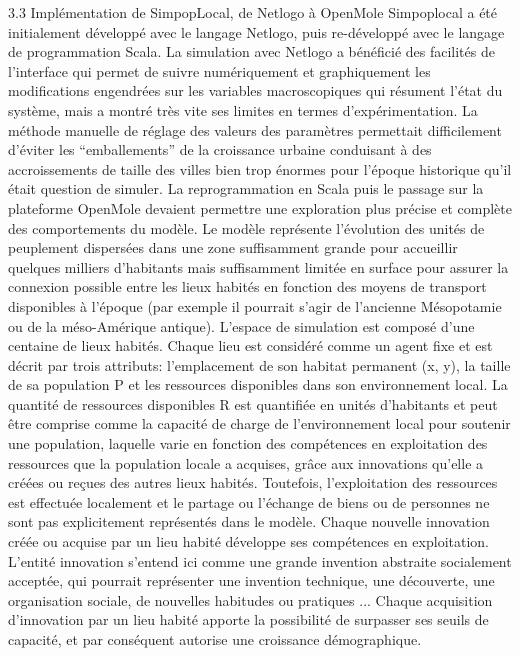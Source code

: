 \documentclass[10pt]{article}
\begin{document}
3.3 Implémentation de SimpopLocal, de Netlogo à OpenMole
Simpoplocal a été initialement développé avec le langage Netlogo, puis re-développé avec le langage de programmation Scala. La simulation avec Netlogo a bénéficié des facilités de l’interface qui permet de suivre numériquement et graphiquement les modifications engendrées sur les variables macroscopiques qui résument l’état du système, mais a montré très vite ses limites en termes d’expérimentation. La méthode manuelle de réglage des valeurs des paramètres permettait difficilement d’éviter les “emballements” de la croissance urbaine conduisant à des accroissements de taille des villes bien trop énormes pour l’époque historique qu’il était question de simuler. La reprogrammation en Scala puis le passage sur la plateforme OpenMole devaient permettre une exploration plus précise et complète des comportements du modèle. 
Le modèle représente l'évolution des unités de peuplement dispersées dans une zone suffisamment grande pour accueillir quelques milliers d'habitants mais suffisamment limitée en surface pour assurer la connexion possible entre les lieux habités en fonction des moyens de transport disponibles à l'époque (par exemple il pourrait s'agir de l’ancienne Mésopotamie ou de la méso-Amérique antique). L'espace de simulation est composé d’une centaine de lieux habités. Chaque lieu est considéré comme un agent fixe et est décrit par trois attributs: l'emplacement de son habitat permanent (x, y), la taille de sa population P et les ressources disponibles dans son environnement local. La quantité de ressources disponibles R est quantifiée en unités d’habitants et peut être comprise comme la capacité de charge de l’environnement local pour soutenir une population, laquelle varie en fonction des compétences en exploitation des ressources que la population locale a acquises, grâce aux innovations qu’elle a créées ou reçues des autres lieux habités. Toutefois, l’exploitation des ressources est effectuée localement et le partage ou l'échange de biens ou de personnes ne sont pas explicitement représentés dans le modèle. Chaque nouvelle innovation créée ou acquise par un lieu habité développe ses compétences en exploitation. L’entité innovation s’entend ici comme une grande invention abstraite socialement acceptée, qui pourrait représenter une invention technique, une découverte, une organisation sociale, de nouvelles habitudes ou pratiques ... Chaque acquisition d’innovation par un lieu habité apporte la possibilité de surpasser ses seuils de capacité, et par conséquent autorise une croissance démographique.
\end{document}
